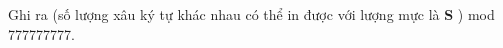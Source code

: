 Ghi ra (số lượng xâu ký tự khác nhau có thể in được với lượng mực là   \textbf{    S   }   ) mod 777777777.